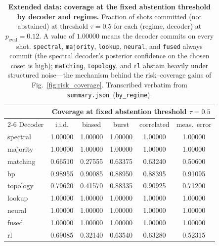 \documentclass[reprint,aps,prxquantum,amsmath,amssymb,floatfix,nofootinbib,longbibliography]{revtex4-2}
\theoremstyle{definition}
\theoremstyle{remark}
\theoremstyle{plain}
\begin{document}
\begin{table}[tb]
    \centering
    \caption{\textbf{Extended data: coverage at the fixed abstention threshold by decoder and regime.} Fraction of shots committed (not abstained) at threshold $\tau=0.5$ for each (regime, decoder) at $p_{\mathrm{eval}}=0.12$. A value of $1.00000$ means the decoder commits on every shot. \texttt{spectral}, \texttt{majority}, \texttt{lookup}, \texttt{neural}, and \texttt{fused} always commit (the spectral decoder's posterior confidence on the chosen coset is high); \texttt{matching}, \texttt{topology}, and \texttt{rl} abstain heavily under structured noise---the mechanism behind the risk--coverage gains of Fig.~\ref{fig:risk_coverage}. Transcribed verbatim from \texttt{summary.json}~(\texttt{by\_regime}).}
    \label{tab:ed_cov}
\begin{tabular}{lccccc}
\toprule
 & \multicolumn{5}{c}{Coverage at fixed abstention threshold $\tau=0.5$} \\
\cmidrule(lr){2-6}
Decoder & i.i.d. & biased & burst & correlated & meas.\ error \\
\midrule
spectral  & 1.00000 & 1.00000 & 1.00000 & 1.00000 & 1.00000 \\
majority  & 1.00000 & 1.00000 & 1.00000 & 1.00000 & 1.00000 \\
matching  & 0.66510 & 0.27555 & 0.63375 & 0.63240 & 0.50600 \\
bp        & 0.98955 & 0.90085 & 0.88950 & 0.88395 & 0.91095 \\
topology  & 0.79620 & 0.41570 & 0.88335 & 0.90925 & 0.71200 \\
lookup    & 1.00000 & 1.00000 & 1.00000 & 1.00000 & 1.00000 \\
neural    & 1.00000 & 1.00000 & 1.00000 & 1.00000 & 1.00000 \\
fused     & 1.00000 & 1.00000 & 1.00000 & 1.00000 & 1.00000 \\
rl        & 0.69085 & 0.32140 & 0.63540 & 0.63280 & 0.52315 \\
\bottomrule
\end{tabular}
\end{table}
\end{document}
